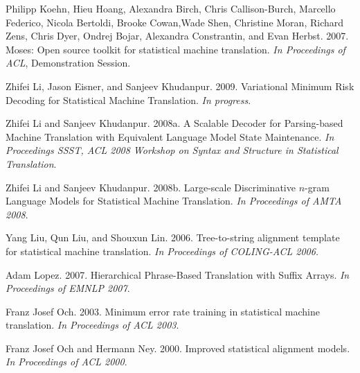 \documentclass[11pt]{article}
\begin{document}
\begin{thebibliography}{}
Philipp Koehn, Hieu Hoang, Alexandra Birch, Chris
Callison-Burch, Marcello Federico, Nicola Bertoldi,
Brooke Cowan,Wade Shen, Christine Moran, Richard
Zens, Chris Dyer, Ondrej Bojar, Alexandra Constrantin,
and Evan Herbst. 2007. Moses: Open source
toolkit for statistical machine translation. \emph{In Proceedings
of ACL}, Demonstration Session.


Zhifei Li, Jason Eisner, and Sanjeev Khudanpur. 2009.
Variational Minimum Risk Decoding for Statistical Machine Translation.
\emph{In progress}.

Zhifei Li and Sanjeev Khudanpur. 2008a.
A Scalable Decoder for Parsing-based Machine Translation with Equivalent Language Model State Maintenance.
\emph{In Proceedings SSST, ACL 2008 Workshop on Syntax and Structure in Statistical Translation}.

Zhifei Li and Sanjeev Khudanpur. 2008b.
Large-scale Discriminative $n$-gram Language Models for Statistical Machine Translation.
\emph{In Proceedings of AMTA 2008}.

Yang Liu, Qun Liu, and Shouxun Lin. 2006. Tree-to-string
alignment template for statistical machine translation.
\emph{In Proceedings of COLING-ACL 2006.}

Adam Lopez. 2007.
Hierarchical Phrase-Based Translation with Suffix Arrays.
\emph{In Proceedings of EMNLP 2007}.


%

Franz Josef Och. 2003. Minimum error rate training in
statistical machine translation.
\emph{In Proceedings of ACL 2003}.

Franz Josef Och and Hermann Ney. 2000. Improved statistical
alignment models. \emph{In Proceedings of ACL 2000}.


\end{thebibliography}
\end{document}
